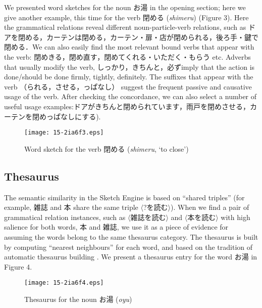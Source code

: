 \documentclass[english]{jnlp_1.4}
\begin{document}
We presented word sketches for the noun お湯 in the opening section; here we give another example, this time for the verb 閉める (\textit{shimeru}) (Figure 3). Here the grammatical relations reveal different noun-particle-verb relations, such as ドアを閉める，カーテンは閉める，カーテン・扉・店が閉められる，後ろ手・鍵で閉める．We can also easily find the most relevant bound verbs that appear with the verb: 閉めきる，閉め直す，閉めてくれる・いただく・もらう etc. Adverbs that usually modify the verb, しっかり，きちんと，必ずimply that the action is done/should be done firmly, tightly, definitely. The suffixes that appear with the verb （られる，させる，っぱなし） suggest the frequent passive and causative usage of the verb. After checking the concordance, we can also select a number of useful usage examples:ドアがきちんと閉められています，雨戸を閉めさせる，カーテンを閉めっぱなしにする).

\begin{figure}[t]
\begin{center}
\texttt{[image: 15-2ia6f3.eps]}
\caption{Word sketch for the verb 閉める
(\textit{shimeru}, `to close')}
\label{fig3}
\end{center}
\end{figure}



\subsection{Thesaurus}

The semantic similarity in the Sketch Engine is based on ``shared
triples'' (for example, 雑誌 and 本 share the same triple
$\langle$?を読む$\rangle$). When we find a pair of
grammatical relation instances, such as
$\langle$雑誌を読む$\rangle$ and
$\langle$本を読む$\rangle$ with high salience for both
words, 本 and 雑誌, we use it as a piece of evidence for
assuming the words belong to the same thesaurus category. The
thesaurus is built by computing ``nearest neighbours'' for each word,
and based on the tradition of automatic thesaurus building
. We present a thesaurus
entry for the word お湯 in Figure 4.

\begin{figure}[b]
\begin{center}
\texttt{[image: 15-2ia6f4.eps]}
\caption{Thesaurus for the noun お湯 (\textit{oyu})}
\label{fig4}
\end{center}
\end{figure}
\end{document}
